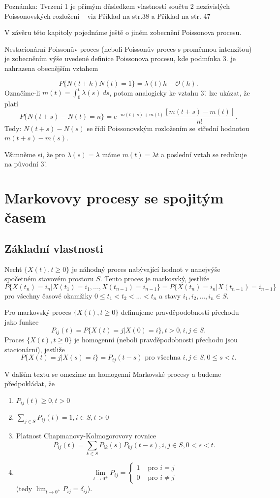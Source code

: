\documentclass[10pt]{article}
\begin{document}
Poznámka: Tvrzení 1 je přímým důsledkem vlastností součtu 2 nezávislých Poissonovských rozložení -- viz Příklad na str.38 a Příklad na str. 47

V závěru této kapitoly pojednáme ještě o jiném zobecnění Poissonova procesu.

Nestacionární Poissonův proces (neboli Poissonův proces s proměnnou intenzitou) je zobecněním výše uvedené definice Poissonova procesu, kde podmínka 3. je nahrazena obecnějším vztahem 

$$P\{N(t+h) N(t)=1\} = \lambda (t) h + \mathcal{O}(h).$$ Označíme-li $m(t) = \int_0^t \lambda(s) \ ds$, potom analogicky ke vztahu 3'. lze ukázat, že platí $$P\{N(t+s)-N(t)=n\} = e^{-m(t+s)+m(t)} \frac{[m(t+s)-m(t)]}{n!}.$$
Tedy: $N(t+s)-N(s)$ se řídí Poissonovským rozložením se střední hodnotou $m(t+s)-m(s)$.

Všimněme si, že pro $\lambda(s)=\lambda$ máme $m(t)=\lambda t$ a poslední vztah se redukuje na původní 3'.

\section{Markovovy procesy se spojitým časem}
\subsection{Základní vlastnosti}
Nechť $\{X(t), t \geq 0\}$ je náhodný proces nabývající hodnot v nanejvýše spočetném stavovém prostoru $S$. Tento proces je markosvký, jestliže
$$P\{X(t_n)=i_n|X(t_1)=i_1,...,X(t_{n-1})=i_{n-1}\}=P\{X(t_n)=i_n|X(t_{n-1})=i_{n-1}\}$$
pro všechny časové okamžiky $0 \leq t_1 < t_2 < ... <t_n$ a stavy $i_1,i_2,...,i_n \in S$.

Pro markovský proces $\{X(t),t \geq 0\}$ definujeme pravděpodobnosti přechodu jako funkce $$P_{ij}(t) = P\{X(t)=j|X(0)=i\}, t>0, i,j \in S.$$ Proces $\{X(t), t \geq 0\}$ je homogenní (neboli pravděpodobnosti přechodu jsou stacionární), jestliže $$P\{X(t)=j|X(s)=i\}=P_{ij}(t-s) \text{ pro všechna }i,j \in S, 0 \leq s < t.$$

V dalším textu se omezíme na homogenní Markovské procesy a budeme předpokládat, že 
\begin{enumerate}
\item $P_{ij}(t) \geq 0, t >0$ 
\item $\sum_{j \in S} P_{ij}(t)=1, i \in S, t > 0$
\item Platnost Chapmanovy-Kolmogorovovy rovnice $$P_{ij}(t) = \sum_{k \in S} P_{ik}(s)P_{kj}(t-s), i,j \in S, 0<s<t.$$
\item 
\begin{equation*}
\lim_{t \to 0^+} P_{ij} =
\begin{cases}
  1 & \text{ pro } i=j\\
  0 & \text{ pro } i \neq j
\end{cases} 
\end{equation*}
(tedy $\lim_{t \to 0^+} P_{ij} = \delta_{ij}$).
\end{enumerate}
\end{document}
